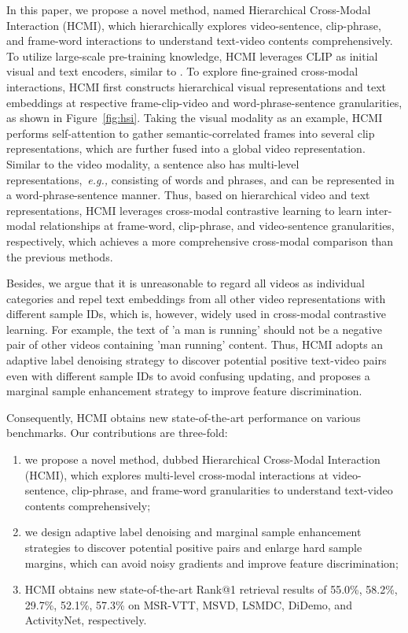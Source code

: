 \documentclass{article}
\begin{document}
In this paper, we propose a novel method, named Hierarchical Cross-Modal Interaction (HCMI), which hierarchically explores video-sentence, clip-phrase, and frame-word interactions to understand text-video contents comprehensively.
To utilize large-scale pre-training knowledge, HCMI leverages CLIP as initial visual and text encoders, similar to \cite{luo2021clip4clip,wang2022disentangled}.
To explore fine-grained cross-modal interactions, HCMI first constructs hierarchical visual representations and text embeddings at respective frame-clip-video and word-phrase-sentence granularities, as shown in Figure~\ref{fig:hsi}. 
Taking the visual modality as an example, HCMI performs self-attention to gather semantic-correlated frames into several clip representations, which are further fused into a global video representation.
Similar to the video modality, a sentence also has multi-level representations,~\emph{e.g.,} consisting of words and phrases, and can be represented in a word-phrase-sentence manner.
Thus, based on hierarchical video and text representations, HCMI leverages cross-modal contrastive learning to learn inter-modal relationships at frame-word, clip-phrase, and video-sentence granularities, respectively, which achieves a more comprehensive cross-modal comparison than the previous methods.

Besides, we argue that it is unreasonable to regard all videos as individual categories and repel text embeddings from all other video representations with different sample IDs, which is, however, widely used in cross-modal contrastive learning.
For example, the text of 'a man is running' should not be a negative pair of other videos containing 'man running' content.
Thus, HCMI adopts an adaptive label denoising strategy to discover potential positive text-video pairs even with different sample IDs to avoid confusing updating, and proposes a marginal sample enhancement strategy to improve feature discrimination.

Consequently, HCMI obtains new state-of-the-art performance on various benchmarks.
Our contributions are three-fold: 
\begin{enumerate}
\item we propose a novel method, dubbed Hierarchical Cross-Modal Interaction (HCMI), which explores multi-level cross-modal interactions at video-sentence, clip-phrase, and frame-word granularities to understand text-video contents comprehensively;
\item we design adaptive label denoising and marginal sample enhancement strategies to discover potential positive pairs and enlarge hard sample margins, which can avoid noisy gradients and improve feature discrimination; 
\item HCMI obtains new state-of-the-art Rank@1 retrieval results of 55.0\%, 58.2\%, 29.7\%, 52.1\%, 57.3\% on MSR-VTT, MSVD, LSMDC, DiDemo, and ActivityNet, respectively.
\end{enumerate}
\end{document}
